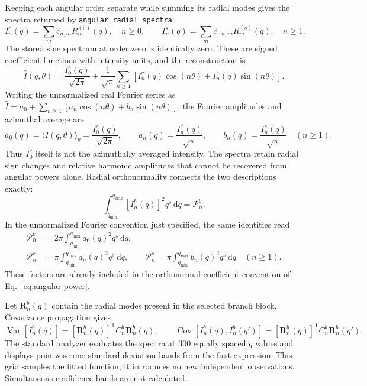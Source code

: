 \documentclass[aps,prb,preprint,onecolumn,notitlepage,amsmath,amssymb,
  superscriptaddress,floatfix]{revtex4-2}
\newcommand{\dd}{\,\mathrm{d}}
\newcommand{\trans}{\mathsf{T}}
\begin{document}
Keeping each angular order separate while summing its radial modes gives
the spectra returned by \texttt{angular\_radial\_spectra}:
\begin{equation}
 I_n^c(q)=\sum_m\widehat c_{n,m}R_m^{(s)}(q),\quad n\geq0,
 \qquad
 I_n^s(q)=\sum_m\widehat c_{-n,m}R_m^{(s)}(q),\quad n\geq1.
 \label{eq:radial-spectra}
\end{equation}
The stored sine spectrum at order zero is identically zero. These are
signed coefficient functions with intensity units, and the reconstruction is
\begin{equation}
 \widehat I(q,\theta)=\frac{I_0^c(q)}{\sqrt{2\pi}}
 +\frac{1}{\sqrt\pi}\sum_{n\geq1}
 \left[I_n^c(q)\cos(n\theta)+I_n^s(q)\sin(n\theta)\right].
 \label{eq:spectral-reconstruction}
\end{equation}
Writing the unnormalized real Fourier series as
$\widehat I=a_0+\sum_{n\geq1}[a_n\cos(n\theta)+b_n\sin(n\theta)]$,
the Fourier amplitudes and azimuthal average are
\begin{equation}
 a_0(q)=\langle\widehat I(q,\theta)\rangle_\theta
 =\frac{I_0^c(q)}{\sqrt{2\pi}},\qquad
 a_n(q)=\frac{I_n^c(q)}{\sqrt\pi},\qquad
 b_n(q)=\frac{I_n^s(q)}{\sqrt\pi}\quad(n\geq1).
 \label{eq:fourier-amplitudes}
\end{equation}
Thus $I_0^c$ itself is not the azimuthally averaged intensity. The spectra
retain radial sign changes and relative harmonic amplitudes that cannot be
recovered from angular powers alone. Radial orthonormality connects the
two descriptions exactly:
\begin{equation}
 \int_{q_{\min}}^{q_{\max}}[I_n^b(q)]^2q^s\dd q=\mathcal{P}_n^b.
 \label{eq:spectrum-power}
\end{equation}
In the unnormalized Fourier convention just specified, the same identities
read
\begin{align*}
 \mathcal{P}_0^c&=2\pi\int_{q_{\min}}^{q_{\max}}a_0(q)^2q^s\dd q,\\
 \mathcal{P}_n^c&=\pi\int_{q_{\min}}^{q_{\max}}a_n(q)^2q^s\dd q,\qquad
 \mathcal{P}_n^s=\pi\int_{q_{\min}}^{q_{\max}}b_n(q)^2q^s\dd q
 \quad(n\geq1).
\end{align*}
These factors are already included in the orthonormal coefficient
convention of Eq.~\eqref{eq:angular-power}.

Let $\bm R_n^b(q)$ contain the radial modes present in the selected branch
block. Covariance propagation gives
\begin{equation}
 \operatorname{Var}[I_n^b(q)]
 =[\bm R_n^b(q)]^{\trans}C_n^b\bm R_n^b(q),
 \qquad
 \operatorname{Cov}[I_n^b(q),I_n^b(q')]
 =[\bm R_n^b(q)]^{\trans}C_n^b\bm R_n^b(q').
 \label{eq:spectrum-error}
\end{equation}
The standard analyzer evaluates the spectra at 300 equally spaced $q$
values and displays pointwise one-standard-deviation bands from the first
expression. This grid samples the fitted function; it introduces no new
independent observations. Simultaneous confidence bands are not calculated.
\end{document}
